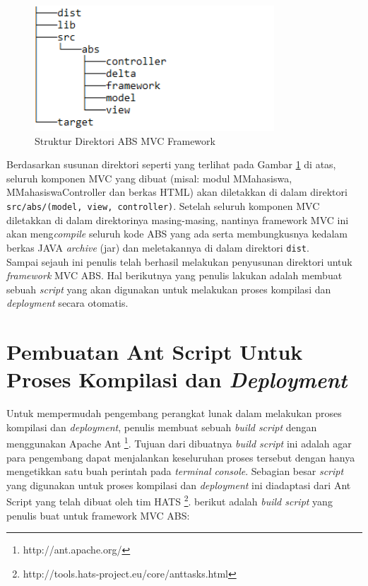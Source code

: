 \begin{figure}
    \centering
    \includegraphics[width=0.8\textwidth]
        {img/struktur-direktori.png}
    \caption{Struktur Direktori ABS MVC Framework}
    \label{fig:strukturDirektori}
\end{figure}

Berdasarkan susunan direktori seperti yang terlihat pada Gambar \ref{fig:strukturDirektori} di atas, seluruh komponen MVC yang dibuat (misal: modul MMahasiswa, MMahasiswaController dan berkas HTML) akan diletakkan di dalam direktori \texttt{src/abs/(model, view, controller)}. Setelah seluruh komponen MVC diletakkan di dalam direktorinya masing-masing, nantinya framework MVC ini akan meng\textit{compile} seluruh kode ABS yang ada serta membungkusnya kedalam berkas JAVA \textit{archive} (jar) dan meletakannya di dalam direktori \texttt{dist}.\\

Sampai sejauh ini penulis telah berhasil melakukan penyusunan direktori untuk \textit{framework} MVC ABS. Hal berikutnya yang penulis lakukan adalah membuat sebuah \textit{script} yang akan digunakan untuk melakukan proses kompilasi dan \textit{deployment} secara otomatis.

\section{Pembuatan Ant Script Untuk Proses Kompilasi dan \textit{Deployment}}

Untuk mempermudah pengembang perangkat lunak dalam melakukan proses kompilasi dan \textit{deployment}, penulis membuat sebuah \textit{build script} dengan menggunakan Apache Ant \footnote{http://ant.apache.org/}. Tujuan dari dibuatnya \textit{build script} ini adalah agar para pengembang dapat menjalankan keseluruhan proses tersebut dengan hanya mengetikkan satu buah perintah pada \textit{terminal console}. Sebagian besar \textit{script} yang digunakan untuk proses kompilasi dan \textit{deployment} ini diadaptasi dari Ant Script yang telah dibuat oleh tim HATS \footnote{http://tools.hats-project.eu/core/anttasks.html}. berikut adalah \textit{build script} yang penulis buat untuk framework MVC ABS:

